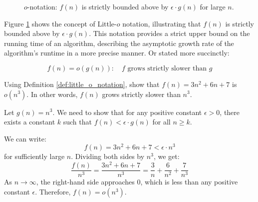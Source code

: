 \begin{figure}[htbp]
    \centering
    \caption{$o$-notation: $f(n)$ is strictly bounded above by $\epsilon \cdot g(n)$ for large $n$.}
    \label{fig:little_o_notation}
\end{figure}

Figure \ref{fig:little_o_notation} shows the concept of Little-$o$ notation, illustrating that $f(n)$ is strictly bounded above by $\epsilon \cdot g(n)$. This notation provides a strict upper bound on the running time of an algorithm, describing the asymptotic growth rate of the algorithm's runtime in a more precise manner. Or stated more succinctly:

\[
f(n)=o(g(n)): \quad f \text{ grows strictly slower than } g
\]

\begin{example}
    Using Definition \ref{def:little_o_notation}, show that $f(n)=3n^2+6n+7$ is $o(n^3)$. In other words, $f(n)$ grows strictly slower than $n^3$.
\end{example}

\begin{solution}
    Let $g(n) = n^3$. We need to show that for any positive constant $\epsilon > 0$, there exists a constant $k$ such that $f(n) < \epsilon \cdot g(n)$ for all $n \geq k$.

    We can write:
    \[
    f(n) = 3n^2 + 6n + 7 < \epsilon \cdot n^3
    \]
    for sufficiently large $n$. Dividing both sides by $n^3$, we get:
    \[
    \frac{f(n)}{n^3} = \frac{3n^2 + 6n + 7}{n^3} = \frac{3}{n} + \frac{6}{n^2} + \frac{7}{n^3}
    \]
    As $n \to \infty$, the right-hand side approaches $0$, which is less than any positive constant $\epsilon$. Therefore, $f(n) = o(n^3)$.
\end{solution}

